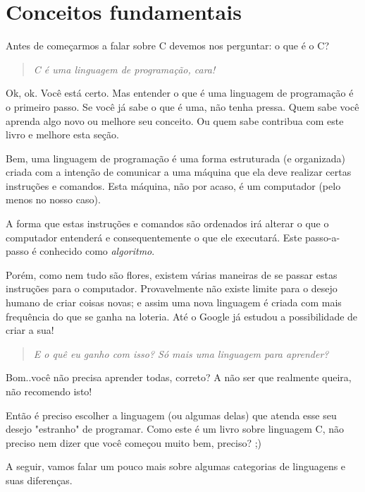 

\chapter{Conceitos fundamentais}
Antes de começarmos a falar sobre C devemos nos perguntar: o que é o C?
\begin{quote}
\textit{C é uma linguagem de programação, cara!}
\end{quote}

Ok, ok. Você está certo. Mas entender o que é uma linguagem de programação é o primeiro passo. Se você já sabe o que é uma, não tenha pressa. Quem sabe você aprenda algo novo ou melhore seu conceito. Ou quem sabe contribua com este livro e melhore esta seção.

Bem, uma linguagem de programação é uma forma estruturada (e organizada) criada com a intenção de comunicar a uma máquina que ela deve realizar certas instruções e comandos. Esta máquina, não por acaso, é um computador (pelo menos no nosso caso).

A forma que estas instruções e comandos são ordenados irá alterar o que o computador entenderá e consequentemente o que ele executará. Este passo-a-passo é conhecido como \textit{algoritmo}.

Porém, como nem tudo são flores, existem várias maneiras de se passar estas instruções para o computador. Provavelmente não existe limite para o desejo humano de criar coisas novas; e assim uma nova linguagem é criada com mais frequência do que se ganha na loteria. Até o Google já estudou a possibilidade de criar a sua!

\begin{quote}
\textit{E o quê eu ganho com isso? Só mais uma linguagem para aprender?}
\end{quote}

Bom..você não precisa aprender todas, correto? A não ser que realmente queira, não recomendo isto!

Então é preciso escolher a linguagem (ou algumas delas) que atenda esse seu desejo "estranho" de programar. Como este é um livro sobre linguagem C, não preciso nem dizer que você começou muito bem, preciso? ;)

A seguir, vamos falar um pouco mais sobre algumas categorias de linguagens e suas diferenças.

